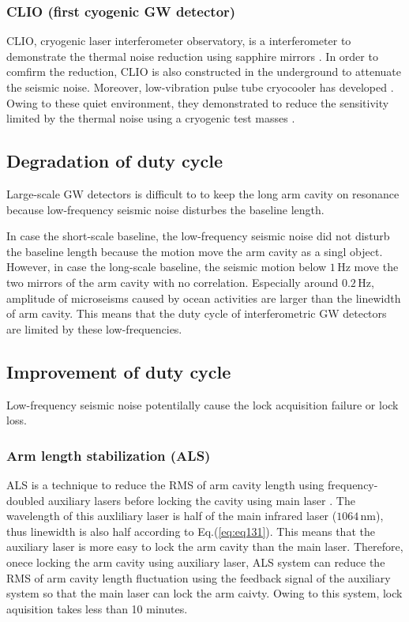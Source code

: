 \subsubsection{CLIO (first cyogenic GW detector)}
CLIO, cryogenic laser interferometer observatory, is a interferometer to demonstrate the thermal noise reduction using sapphire mirrors \cite{ohashi2003design}. In order to comfirm the reduction, CLIO is also constructed in the underground to attenuate the seismic noise. Moreover, low-vibration pulse tube cryocooler has developed \cite{tomaru2004development}. Owing to these quiet environment, they demonstrated to reduce the sensitivity limited by the thermal noise using a cryogenic test masses \cite{uchiyama2012reduction}.


\newpage
\subsection{Degradation of duty cycle }
Large-scale GW detectors is difficult to to keep the long arm cavity on resonance because low-frequency seismic noise disturbes the baseline length.

In case the short-scale baseline, the low-frequency seismic noise did not disturb the baseline length because the motion move the arm cavity as a singl object. However, in case the long-scale baseline, the seismic motion below $1\,\mathrm{Hz}$ move the two mirrors of the arm cavity with no correlation. Especially around $0.2\,\mathrm{Hz}$, amplitude of microseisms caused by ocean activities are larger than the linewidth of arm cavity. This means that the duty cycle of interferometric GW detectors are limited by these low-frequencies.

\subsection{Improvement of duty cycle}
Low-frequency seismic noise potentilally cause the lock acquisition failure or lock loss. 

\subsubsection{Arm length stabilization (ALS)}
ALS is a technique to reduce the RMS of arm cavity length using frequency-doubled auxiliary lasers before locking the cavity using main laser \cite{mullavey2012arm,izumi2012multi}. The wavelength of this auxliliary laser is half of the main infrared laser ($1064\,\mathrm{nm}$), thus linewidth is also half according to Eq.(\ref{eq:eq131}). This means that the auxiliary laser is more easy to lock the arm cavity than the main laser. Therefore, onece locking the arm cavity using auxiliary laser, ALS system can reduce the RMS of arm cavity length fluctuation using the feedback signal of the auxiliary system so that the main laser can lock the arm caivty. Owing to this system, lock aquisition takes less than 10 minutes.

